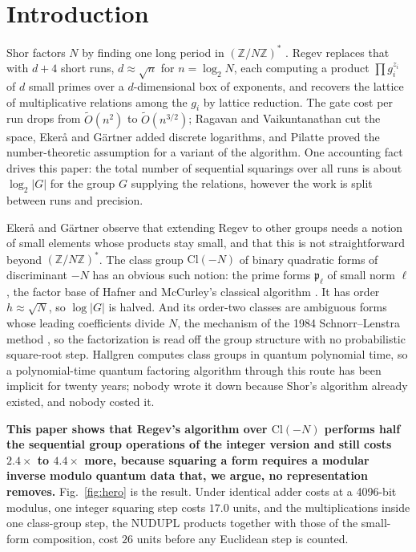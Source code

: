 \documentclass[conference]{IEEEtran}
\newcommand{\Cl}{\mathrm{Cl}}
\newcommand{\Z}{\mathbb{Z}}
\newcommand{\p}{\mathfrak{p}}
\begin{document}
\section{Introduction}
Shor factors $N$ by finding one long period in $(\Z/N\Z)^*$ \cite{shor1997}. Regev \cite{regev2023} replaces that with $d+4$ short runs, $d\approx\sqrt n$ for $n=\log_2N$, each computing a product $\prod g_i^{z_i}$ of $d$ small primes over a $d$-dimensional box of exponents, and recovers the lattice of multiplicative relations among the $g_i$ by lattice reduction. The gate cost per run drops from $\tilde O(n^2)$ to $\tilde O(n^{3/2})$; Ragavan and Vaikuntanathan \cite{ragavan2024} cut the space, Eker\aa{} and G\"artner \cite{ekera2024} added discrete logarithms, and Pilatte \cite{pilatte2024} proved the number-theoretic assumption for a variant of the algorithm. One accounting fact drives this paper: the total number of sequential squarings over all runs is about $\log_2|G|$ for the group $G$ supplying the relations, however the work is split between runs and precision.

Eker\aa{} and G\"artner observe that extending Regev to other groups needs a notion of small elements whose products stay small, and that this is not straightforward beyond $(\Z/N\Z)^*$. The class group $\Cl(-N)$ of binary quadratic forms of discriminant $-N$ has an obvious such notion: the prime forms $\p_\ell$ of small norm $\ell$, the factor base of Hafner and McCurley's classical algorithm \cite{hafner1989}. It has order $h\approx\sqrt N$, so $\log|G|$ is halved. And its order-two classes are ambiguous forms whose leading coefficients divide $N$, the mechanism of the 1984 Schnorr--Lenstra method \cite{schnorr1984}, so the factorization is read off the group structure with no probabilistic square-root step. Hallgren \cite{hallgren2005} computes class groups in quantum polynomial time, so a polynomial-time quantum factoring algorithm through this route has been implicit for twenty years; nobody wrote it down because Shor's algorithm already existed, and nobody costed it.

\textbf{This paper shows that Regev's algorithm over $\Cl(-N)$ performs half the sequential group operations of the integer version and still costs $2.4\times$ to $4.4\times$ more, because squaring a form requires a modular inverse modulo quantum data that, we argue, no representation removes.} Fig.~\ref{fig:hero} is the result. Under identical adder costs at a 4096-bit modulus, one integer squaring step costs $17.0$ units, and the multiplications inside one class-group step, the NUDUPL products together with those of the small-form composition, cost $26$ units before any Euclidean step is counted.
\end{document}
